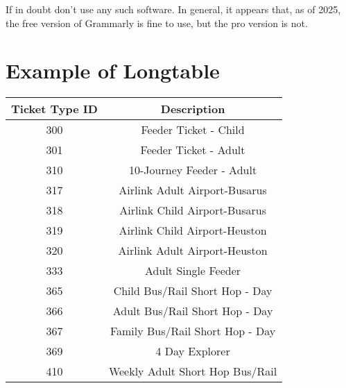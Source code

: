 If in doubt don't use any such software. In general, it appears that, as of
2025, the free version of Grammarly is fine to use, but the pro version is not.

\newpage

\section{Example of Longtable}\label{app:tickettypes}
\footnotesize{} 
\begin{longtable}[htbp]
	{cc} \hline \textbf{Ticket Type ID} & \textbf{Description}     \\\hline \hline \hline
	\endhead

	300                                 &
	Feeder Ticket - Child                                          \\
	\hline 301                          &
	Feeder Ticket - Adult                                          \\
	\hline 310                          &
	10-Journey Feeder - Adult                                      \\
	\hline 317                          &
	Airlink Adult Airport-Busarus                                  \\
	\hline 318                          &
	Airlink Child Airport-Busarus                                  \\
	\hline 319                          &
	Airlink Child Airport-Heuston                                  \\
	\hline 320                          &
	Airlink Adult Airport-Heuston                                  \\
	\hline 333                          &
	Adult Single Feeder                                            \\
	\hline 365                          &
	Child Bus/Rail Short Hop - Day                                 \\
	\hline 366                          &
	Adult Bus/Rail Short Hop - Day                                 \\
	\hline 367                          &
	Family Bus/Rail Short Hop - Day                                \\
	\hline 369                          &
	4 Day Explorer                                                 \\
	\hline 410                          &
	Weekly Adult Short Hop Bus/Rail                                \\

\end{longtable}
